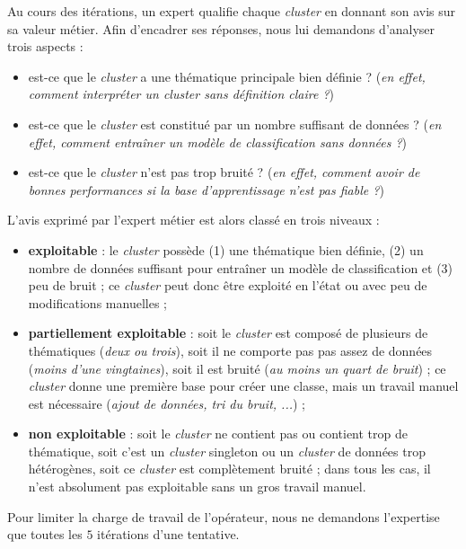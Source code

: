 			Au cours des itérations, un expert qualifie chaque \textit{cluster} en donnant son avis sur sa valeur métier.
			Afin d'encadrer ses réponses, nous lui demandons d'analyser trois aspects :
			\begin{itemize}
				\item est-ce que le \textit{cluster} a une thématique principale bien définie ? (\textit{en effet, comment interpréter un cluster sans définition claire ?})
				\item est-ce que le \textit{cluster} est constitué par un nombre suffisant de données ? (\textit{en effet, comment entraîner un modèle de classification sans données ?})
				\item est-ce que le \textit{cluster} n'est pas trop bruité ? (\textit{en effet, comment avoir de bonnes performances si la base d'apprentissage n'est pas fiable ?})
			\end{itemize}
			
			L'avis exprimé par l'expert métier est alors classé en trois niveaux :
			\begin{itemize}
				\item \textbf{exploitable} : le \textit{cluster} possède (1) une thématique bien définie, (2) un nombre de données suffisant pour entraîner un modèle de classification et (3) peu de bruit ; ce \textit{cluster} peut donc être exploité en l'état ou avec peu de modifications manuelles ;
				\item \textbf{partiellement exploitable} : soit le \textit{cluster} est composé de plusieurs de thématiques (\textit{deux ou trois}), soit il ne comporte pas pas assez de données (\textit{moins d'une vingtaines}), soit il est bruité (\textit{au moins un quart de bruit}) ; ce \textit{cluster} donne une première base pour créer une classe, mais un travail manuel est nécessaire (\textit{ajout de données, tri du bruit, ...}) ;
				\item \textbf{non exploitable} : soit le \textit{cluster} ne contient pas ou contient trop de thématique, soit c'est un \textit{cluster} singleton ou un \textit{cluster} de données trop hétérogènes, soit ce \textit{cluster} est complètement bruité ; dans tous les cas, il n'est absolument pas exploitable sans un gros travail manuel.
			\end{itemize}
			
			Pour limiter la charge de travail de l'opérateur, nous ne demandons l'expertise que toutes les $5$ itérations d'une tentative.
			
